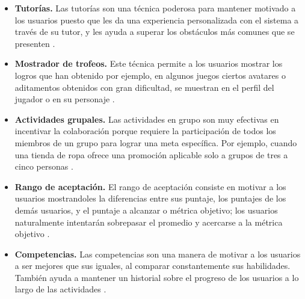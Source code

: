     \begin{itemize}

    \item
    {\bf Tutorías.}
        Las tutorías son una técnica poderosa para mantener motivado a los usuarios
        puesto que les da una experiencia personalizada con el sistema a través de su
        tutor, y les ayuda a superar los obstáculos más comunes que se presenten
        \cite[p. 215]{Octalysis}.

    \item
    {\bf Mostrador de trofeos.}
        Este técnica permite a los usuarios mostrar los logros que han obtenido
        por ejemplo, en algunos juegos ciertos avatares o aditamentos obtenidos con
        gran dificultad, se muestran en el perfil del jugador o en su personaje
        \cite[p. 218]{Octalysis}.

    \item
    {\bf Actividades grupales.}
        Las actividades en grupo son muy efectivas en incentivar la colaboración
        porque requiere la participación de todos los miembros de un grupo para
        lograr una meta específica. Por ejemplo, cuando una tienda de ropa ofrece
        una promoción aplicable solo a grupos de tres a cinco personas
        \cite[p. 221]{Octalysis}.

    \item
    {\bf Rango de aceptación.} %
        El rango de aceptación consiste en motivar a los usuarios mostrandoles
        la diferencias entre sus puntaje, los puntajes de los demás usuarios,
        y el puntaje a alcanzar o métrica objetivo; los usuarios naturalmente
        intentarán sobrepasar el promedio y acercarse a la métrica objetivo
        \cite[p. 226]{Octalysis}.

    \item
    {\bf Competencias.}
        Las competencias son una manera de motivar a los usuarios a ser mejores
        que sus iguales, al comparar constantemente sus habilidades. También ayuda
        a mantener un historial sobre el progreso de los usuarios a lo largo de las
        actividades \cite[p. 210]{Octalysis}.


    \end{itemize}

